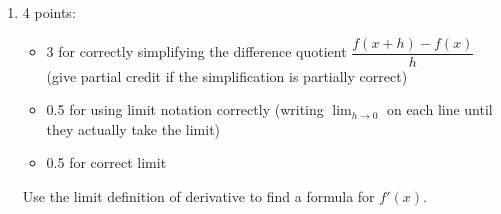\documentclass{article}
\begin{document}
\begin{enumerate}
\begin{enumerate}
    \begin{problem}[\vfill]
      Using only the graph you sketched in \ref{derivative-of-1/x-graph-1/x}, sketch a rough graph of $f'(x)$. 
    \end{problem}

    \begin{solution}       
      \begin{center}
      \end{center}
      At any point on the graph of $f(x)$, the slope of the tangent line is negative, so $f'(x)$ is always negative.

      Because $f$ is odd, the slope of the tangent line at $x = a$ is equal to the slope of the tangent line at $x = -a$. That makes $f'$ even.

      As $x$ gets close to 0, the slope of the tangent line becomes very steep, so $f'$ is very negative when $x$ is close to 0.
    \end{solution}

  \item \label{derivative-of-1/x-calculate}

    \begin{grading} 
      4 points:
      \begin{itemize}[nosep]
      \item 3 for correctly simplifying the difference quotient $\dfrac{ f(x+h) - f(x) }{h}$ (give partial credit if the simplification is partially correct)
      \item 0.5 for using limit notation correctly (writing $\displaystyle \lim_{h \to 0}$ on each line until they actually take the limit)
      \item 0.5 for correct limit
      \end{itemize}
    \end{grading} 

    \begin{problem}[\nstretch{2.25}]
      Use the limit definition of derivative to find a formula for $f'(x)$.
    \end{problem}


\end{enumerate}
\end{enumerate}
\end{document}
